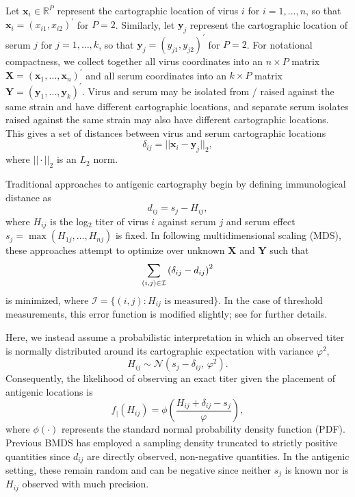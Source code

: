 \documentclass[11pt,oneside,letterpaper]{article}
\newcommand{\virus}{\mathbf{x}}						%
\newcommand{\serum}{\mathbf{y}}						%
\newcommand{\viruses}{\mathbf{X}}					%
\newcommand{\sera}{\mathbf{Y}}						%
\newcommand{\se}{s}									%
\newcommand{\point}{f_{\scriptscriptstyle \vert}}	%
\newcommand{\mdssd}{\varphi}						%
\newcommand{\vn}{n}									%
\newcommand{\sn}{k}									%
\newcommand{\normal}{\mathcal{N}}					%
\begin{document}
Let $\virus_i \in \mathbb{R}^{P}$ represent the cartographic location of virus $i$ for $i = 1,\ldots,\vn$, so that $\virus_i = (x_{i1}, x_{i2})^{\prime}$ for $P=2$. 
Similarly, let $\serum_j$ represent the cartographic location of serum $j$ for $j = 1,\ldots,\sn$, so that $\serum_j = (y_{j1},y_{j2})^{\prime}$ for $P=2$.
For notational compactness, we collect together all virus coordinates into an $\vn \times P$ matrix  $\viruses = (\virus_1, \ldots, \virus_{\vn})^{\prime}$ and all serum coordinates into an $\sn \times P$ matrix $\sera = (\serum_{1},\ldots,\serum_{\sn})^{\prime}$.
Virus and serum may be isolated from / raised against the same strain and have different cartographic locations, and separate serum isolates raised against the same strain may also have different cartographic locations. 
This gives a set of distances between virus and serum cartographic locations 
\begin{equation}
	\delta_{ij} =  || \virus_i - \serum_j ||_2,
\end{equation}
where $|| \cdot ||_2$ is an $L_2$ norm.

Traditional approaches to antigenic cartography \cite{Smith04} begin by defining immunological distance as
\begin{equation}
	d_{ij} =  \se_j - H_{ij},
\end{equation}
where $H_{ij}$ is the log$_2$ titer of virus $i$ against serum $j$ and serum effect $\se_j = \max ( H_{1j},\ldots,H_{\vn j} )$ is fixed.
In following multidimensional scaling (MDS), these approaches attempt to optimize over unknown $\viruses$ and $\sera$ such that
\begin{equation} \label{mds}
	\sum_{(i,j) \in \cal I} 
	\left(
		\delta_{ij} - d_{ij}
	\right)^2
\end{equation}
is minimized, where $\mathcal{I} = \{ (i,j) : H_{ij} \mbox{ is measured} \}$.
In the case of threshold measurements, this error function is modified slightly; see \cite{Smith04} for further details.

Here, we instead assume a probabilistic interpretation in which an observed titer is normally distributed around its cartographic expectation with variance $\mdssd^2$,
\begin{equation} \label{hij}
	H_{ij} \sim \normal( \se_j - \delta_{ij}, \, \mdssd^2 ).
\end{equation}
Consequently, the likelihood of observing an exact titer given the placement of antigenic locations is 
\begin{equation} 
	\point(H_{ij}) = \phi \left( \frac{ H_{ij} + \delta_{ij} - \se_j }{ \mdssd } \right),
\end{equation}
where $\phi(\cdot)$ represents the standard normal probability density function (PDF).
Previous BMDS has employed a sampling density truncated to strictly positive quantities since $d_{ij}$ are directly observed, non-negative quantities.  
In the antigenic setting, these remain random and can be negative since neither $\se_j$ is known nor is $H_{ij}$ observed with much precision. 
\end{document}
